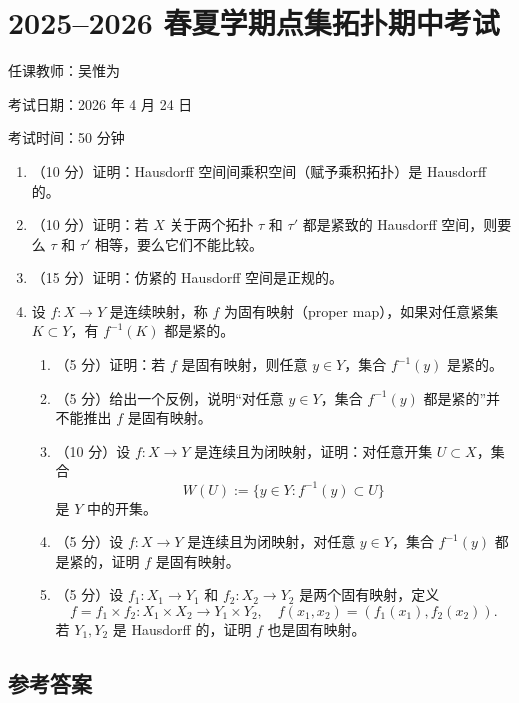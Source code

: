 \documentclass{article}
\begin{document}
\section{2025--2026 春夏学期点集拓扑期中考试}

任课教师：吴惟为

考试日期：2026 年 4 月 24 日

考试时间：50 分钟

\begin{enumerate}
  \item （10 分）证明：Hausdorff 空间间乘积空间（赋予乘积拓扑）是 Hausdorff 的。

  \item （10 分）证明：若 $X$ 关于两个拓扑 $\tau$ 和 $\tau'$ 都是紧致的 Hausdorff 空间，则要么 $\tau$ 和 $\tau'$ 相等，要么它们不能比较。

  \item （15 分）证明：仿紧的 Hausdorff 空间是正规的。

  \item 设 $f : X \to Y$ 是连续映射，称 $f$ 为固有映射（proper map），如果对任意紧集 $K\subset Y$，有 $f^{-1}(K)$ 都是紧的。
        \begin{enumerate}
          \item （5 分）证明：若 $f$ 是固有映射，则任意 $y\in Y$，集合 $f^{-1}(y)$ 是紧的。
          \item （5 分）给出一个反例，说明“对任意 $y\in Y$，集合 $f^{-1}(y)$ 都是紧的”并不能推出 $f$ 是固有映射。
          \item （10 分）设 $f : X \to Y$ 是连续且为闭映射，证明：对任意开集 $U\subset X$，集合
                \[
                  W(U):=\{y\in Y: f^{-1}(y)\subset U\}
                \]
                是 $Y$ 中的开集。
          \item （5 分）设 $f : X \to Y$ 是连续且为闭映射，对任意 $y\in Y$，集合 $f^{-1}(y)$ 都是紧的，证明 $f$ 是固有映射。
          \item （5 分）设 $f_1 : X_1 \to Y_1$ 和 $f_2 : X_2 \to Y_2$ 是两个固有映射，定义
                \[
                  f=f_1\times f_2 : X_1\times X_2 \to Y_1\times Y_2,
                  \quad
                  f(x_1,x_2)=(f_1(x_1),f_2(x_2)).
                \]
                若 $Y_1,Y_2$ 是 Hausdorff 的，证明 $f$ 也是固有映射。
        \end{enumerate}
\end{enumerate}

\subsection*{参考答案}
\end{document}
